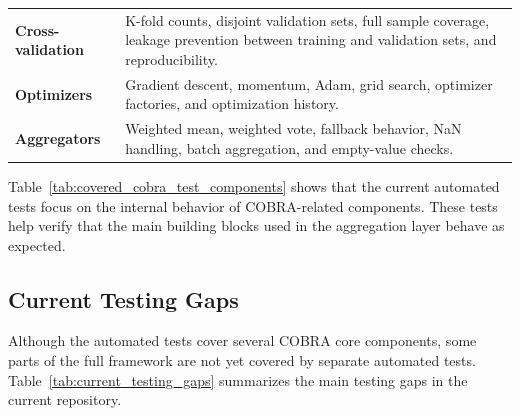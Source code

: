 \begin{table}[H]
\begin{tabularx}{\textwidth}{
                  >{\raggedright\arraybackslash}p{3.2cm}
                  >{\raggedright\arraybackslash}X
            }
            \textbf{Cross-validation} &
            K-fold counts, disjoint validation sets, full sample coverage, leakage prevention between training and validation sets, and reproducibility.        \\

            \textbf{Optimizers}       &
            Gradient descent, momentum, Adam, grid search, optimizer factories, and optimization history.                                                       \\

            \textbf{Aggregators}      &
            Weighted mean, weighted vote, fallback behavior, NaN handling, batch aggregation, and empty-value checks.                                           \\
            \bottomrule
      \end{tabularx}

\end{table}

Table~\ref{tab:covered_cobra_test_components} shows that the current automated tests focus on the internal behavior of COBRA-related components. These tests help verify that the main building blocks used in the aggregation layer behave as expected.

\subsection{Current Testing Gaps}

\hs Although the automated tests cover several COBRA core components, some parts of the full framework are not yet covered by separate automated tests. Table~\ref{tab:current_testing_gaps} summarizes the main testing gaps in the current repository.

